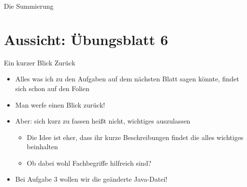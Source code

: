 \begin{frame}[fragile,c]{Die Summierung}
\end{frame}



\iffull
{}
\section{Aussicht: Übungsblatt 6}
\begin{frame}{Ein kurzer Blick Zurück}
    \begin{itemize}[<+(1)->]
        \itemsep5pt
        \item Alles was ich zu den Aufgaben auf dem nächsten Blatt sagen könnte, findet sich schon auf den Folien 
        \item Man werfe einen Blick zurück!
        \item Aber: sich kurz zu fassen heißt nicht, wichtiges auszulassen \begin{itemize}
            \item Die Idee ist eher, dass ihr kurze Beschreibungen findet die alles wichtiges beinhalten
            \item Ob dabei wohl Fachbegriffe hilfreich sind?
        \end{itemize}
        \item Bei Aufgabe 3 wollen wir die geänderte Java-Datei!
    \end{itemize}
\end{frame}
\fi



